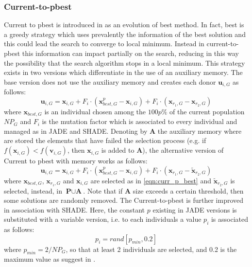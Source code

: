 \subsubsection{Current-to-pbest}\label{subsubsec:curr_p_best}
Current to pbest is introduced in \cite{JADE:2009} as an evolution of best method. In fact, best is a greedy strategy which uses prevalently the information of the best solution and this could lead the search to converge to local minimum. Instead in current-to-pbest this information can impact partially on the search, reducing in this way the possibility that the search algorithm stops in a local minimum.\newline\newline
This strategy exists in two versions which differentiate in the use of an auxiliary memory. The base version does not use the auxiliary memory and creates each donor $\textbf{u}_{i, G}$ as follows:
\begin{equation}
	\textbf{u}_{i, G} = \textbf{x}_{i, G} + F_i \cdot (\textbf{x}_{\textit{best}, G}^p - \textbf{x}_{i, G}) + F_i \cdot (\textbf{x}_{r_1, G} - \textbf{x}_{r_2, G})
\end{equation}\label{eqn:curr_p_best}
where $\textbf{x}_{\textit{best}, G}$ is an individual chosen among the $100p\%$ of the current population $\textit{NP}_{G}$ and $F_i$ is the mutation factor which is associated to every individual and managed as in JADE and SHADE.\newline\newline
Denoting by \textbf{A} the auxiliary memory where are stored the elements that have failed the selection process (e.g. if $f(\textbf{x}_{i, G}) < f(\textbf{v}_{i, G})$, then $\textbf{x}_{i, G}$ is added to $\textbf{A}$), the alternative version of Current to pbest with memory works as follows:
\begin{equation}
	\textbf{u}_{i, G} = \textbf{x}_{i, G} + F_i \cdot (\textbf{x}_{\textit{best}, G}^{p} - \textbf{x}_{i, G}) + F_i \cdot (\textbf{x}_{r_1, G} - \tilde{\textbf{x}}_{r_2, G})
\end{equation}
where $\textbf{x}_{\textit{best}, G}$, $\textbf{x}_{r_1, G}$ and $\textbf{x}_{i, G}$ are selected as in \ref{eqn:curr_p_best} and $\tilde{\textbf{x}}_{r_2, G}$ is selected, instead, in $\textbf{P} \cup \textbf{A}$. Note that if $\textbf{A}$ size exceeds a certain threshold, then some solutions are randomly removed.\newline\newline
The Current-to-pbest is further improved in association with SHADE. Here, the constant $p$ existing in JADE versions is substituted with a variable version, i.e. to each individuals a value $p_i$ is associated as follows:
\begin{equation}
p_i = rand[p_{\textit{min}}, 0.2]
\end{equation}
where $p_{\textit{min}} = 2 / \textit{NP}_G$, so that at least 2 individuals are selected, and 0.2 is the maximum value as suggest in \cite{JADE:2009}.
